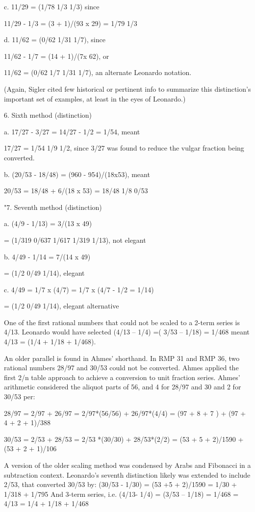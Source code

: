 \documentclass[12pt]{article}
\begin{document}
c. 11/29 = (1/78 1/3 1/3) since

11/29 - 1/3 = (3 + 1)/(93 x 29) = 1/79 1/3

d. 11/62 = (0/62 1/31 1/7), since

11/62 - 1/7 = (14 + 1)/(7x 62), or

11/62 = (0/62 1/7 1/31 1/7), an alternate Leonardo notation.

(Again, Sigler cited few historical or pertinent info to summarize this distinction's important set of examples, at least in the eyes of Leonardo.)

6. Sixth method (distinction)

a. 17/27 - 3/27 = 14/27 - 1/2 = 1/54, meant

17/27 = 1/54 1/9 1/2, since 3/27 was found to reduce the vulgar fraction being converted.

b. (20/53 - 18/48) = (960 - 954)/(18x53), meant

20/53 = 18/48 + 6/(18 x 53) = 18/48 1/8 0/53


"7. Seventh method (distinction)

a. (4/9 - 1/13) = 3/(13 x 49)

= (1/319 0/637 1/617 1/319 1/13), not elegant

b. 4/49 - 1/14 = 7/(14 x 49)

= (1/2 0/49 1/14), elegant

c. 4/49 = 1/7 x (4/7) = 1/7 x (4/7 - 1/2 = 1/14)

= (1/2 0/49 1/14), elegant alternative

One of the first rational numbers that could not be scaled to a 2-term series is 4/13. Leonardo would have selected (4/13 – 1/4) =( 3/53 – 1/18) = 1/468 meant 4/13 = (1/4 + 1/18 + 1/468). 

An older parallel is found in Ahmes' shorthand. In RMP 31 and RMP 36, two rational numbers 28/97 and 30/53 could not be converted. Ahmes applied the first 2/n table approach to achieve a conversion to unit fraction series. Ahmes' arithmetic considered the aliquot parts of 56, and 4 for 28/97 and 30 and 2 for 30/53 per:

28/97 = 2/97 + 26/97 = 2/97*(56/56) + 26/97*(4/4) = (97 + 8 + 7 ) + (97 + 4 + 2 + 1)/388

30/53 = 2/53 + 28/53 = 2/53 *(30/30) + 28/53*(2/2) = (53 + 5 + 2)/1590 + (53 + 2 + 1)/106

A version of the older scaling method was condensed by Arabs and Fibonacci in a subtraction context. Leonardo's seventh distinction likely was extended to include 2/53, that converted 30/53 by:
(30/53 - 1/30) = (53 +5 + 2)/1590 = 1/30 + 1/318 + 1/795 
And 3-term series, i.e. (4/13- 1/4) = (3/53 – 1/18) = 1/468 = 4/13 = 1/4 + 1/18 + 1/468 
\end{document}
